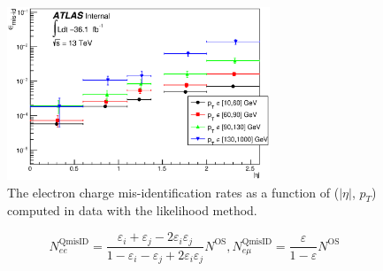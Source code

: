 \begin{figure}[h]
 \centering
 \includegraphics[width=0.70\textwidth]{fig/QmisID/Rates_tight.eps}
\caption{The electron charge mis-identification rates as a function of ($|\eta|$, $p_T$) computed in data with the likelihood method.}
\label{fig:qmisid_rates}
\end{figure}

\begin{equation}
N_{ee}^{\text{QmisID}}=\frac{\varepsilon_i+\varepsilon_j-2\varepsilon_i \varepsilon_j}{1-\varepsilon_i-\varepsilon_j +2\varepsilon_i \varepsilon_j}N^{\text{OS}},
N_{e\mu}^{\text{QmisID}}=\frac{\varepsilon}{1-\varepsilon}N^{\text{OS}}
\label{eq:qmisid_evts}
\end{equation}

